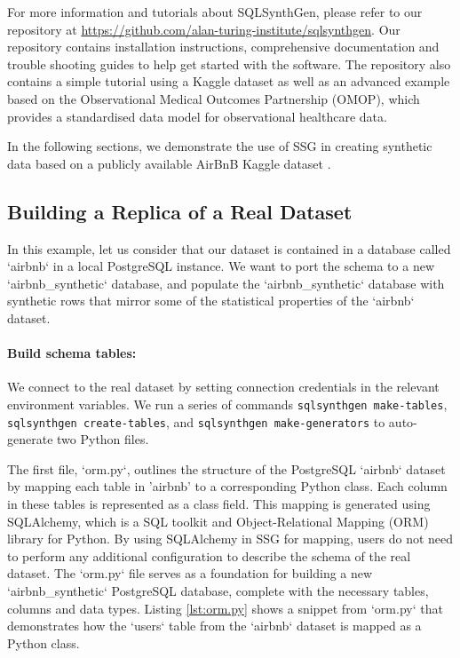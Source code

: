 \documentclass[11pt]{article}
\begin{document}
For more information and tutorials about SQLSynthGen, please refer to our repository at \url{https://github.com/alan-turing-institute/sqlsynthgen}. Our repository \cite{repository} contains installation instructions, comprehensive documentation and trouble shooting guides to help get started with the software. The repository also contains a simple tutorial using a Kaggle dataset \cite{airbnb} as well as an advanced example based on the Observational Medical Outcomes Partnership (OMOP)\cite{omop}, which provides a standardised data model for observational healthcare data. 

In the following sections, we demonstrate the use of SSG in creating synthetic data based on a publicly available AirBnB Kaggle dataset \cite{airbnb}.

\subsection{Building a Replica of a Real Dataset}

In this example, let us consider that our dataset is contained in a database called `airbnb` in a local PostgreSQL instance. We want to port the schema to a new `airbnb\_synthetic` database, and populate the `airbnb\_synthetic` database with synthetic rows that mirror some of the statistical properties of the `airbnb` dataset.

\paragraph{Build schema tables:}

We connect to the real dataset by setting connection credentials in the relevant environment variables. We run a series of commands \texttt{sqlsynthgen make-tables}, \texttt{sqlsynthgen create-tables}, and \texttt{sqlsynthgen make-generators} to auto-generate two Python files. 

The first file, `orm.py`, outlines the structure of the PostgreSQL `airbnb` dataset by mapping each table in 'airbnb' to a corresponding Python class. Each column in these tables is represented as a class field. This mapping is generated using SQLAlchemy\cite{sqlalchemy}, which is a SQL toolkit and Object-Relational Mapping (ORM) library for Python. By using SQLAlchemy in SSG for mapping, users do not need to perform any additional configuration to describe the schema of the real dataset. The `orm.py` file serves as a foundation for building a new `airbnb\_synthetic` PostgreSQL database, complete with the necessary tables, columns and data types. Listing \ref{lst:orm.py} shows a snippet from `orm.py` that demonstrates how the  `users` table from the `airbnb`  dataset is mapped as a Python class.
\end{document}
